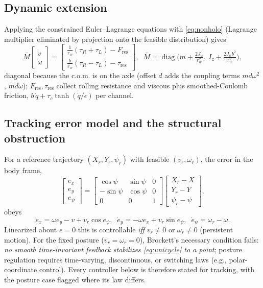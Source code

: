 \documentclass[conference]{IEEEtran}
\newcommand{\diag}{\operatorname{diag}}
\begin{document}
\subsection{Dynamic extension}
Applying the constrained Euler--Lagrange equations with \eqref{eq:nonholo} (Lagrange multiplier eliminated by projection onto the feasible distribution) gives
\begin{equation}
\bar M\begin{bmatrix}\dot v\\ \dot\omega\end{bmatrix} =
\begin{bmatrix}\frac{1}{r_w}(\tau_R + \tau_L) - F_{\mathrm{res}}\\[2pt]
\frac{b}{r_w}(\tau_R - \tau_L) - \tau_{\mathrm{res}}\end{bmatrix},\;\;
\bar M = \diag\!\bigl(m + \tfrac{2J_w}{r_w^2},\ I_z + \tfrac{2J_w b^2}{r_w^2}\bigr),
\label{eq:dyn}
\end{equation}
diagonal because the c.o.m. is on the axle (offset $d$ adds the coupling terms $m d\omega^2$, $m d\dot\omega$); $F_{\mathrm{res}}, \tau_{\mathrm{res}}$ collect rolling resistance and viscous plus smoothed-Coulomb friction, $b\,\dot q + \tau_c\tanh(\dot q/\epsilon)$ per channel.

\subsection{Tracking error model and the structural obstruction}
For a reference trajectory $(X_r, Y_r, \psi_r)$ with feasible $(v_r, \omega_r)$, the error in the body frame,
\begin{equation}
\begin{bmatrix}e_x\\ e_y\\ e_\psi\end{bmatrix} =
\begin{bmatrix}\cos\psi & \sin\psi & 0\\ -\sin\psi & \cos\psi & 0\\ 0&0&1\end{bmatrix}
\begin{bmatrix}X_r - X\\ Y_r - Y\\ \psi_r - \psi\end{bmatrix},
\end{equation}
obeys
\begin{equation}
\dot e_x = \omega e_y - v + v_r\cos e_\psi,\;\;
\dot e_y = -\omega e_x + v_r\sin e_\psi,\;\;
\dot e_\psi = \omega_r - \omega.
\label{eq:trackerr}
\end{equation}
Linearized about $e=0$ this is controllable \emph{iff} $v_r \neq 0$ or $\omega_r \neq 0$ (persistent motion). For the fixed posture ($v_r{=}\omega_r{=}0$), Brockett's necessary condition fails: \emph{no smooth time-invariant feedback stabilizes \eqref{eq:unicycle} to a point}; posture regulation requires time-varying, discontinuous, or switching laws (e.g., polar-coordinate control). Every controller below is therefore stated for tracking, with the posture case flagged where its law differs.
\end{document}
